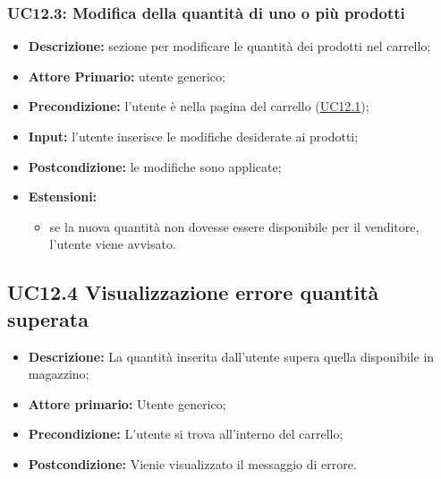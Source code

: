         \subsubsection{UC12.3: Modifica della quantità di uno o più prodotti}
        \begin{itemize}
            \item \textbf{Descrizione:} sezione per modificare le quantità dei prodotti nel carrello;
            \item \textbf{Attore Primario:} utente generico;
            \item \textbf{Precondizione:} l'utente è nella pagina del carrello (\hyperref[sec:UC12.1]{\underline{UC12.1}});
            \item \textbf{Input:} l'utente inserisce le modifiche desiderate ai prodotti;
            \item \textbf{Postcondizione:} le modifiche sono applicate;
            \item \textbf{Estensioni:} 
                \begin{itemize}
                    \item se la nuova quantità non dovesse essere disponibile per il venditore, l'utente viene avvisato.
                \end{itemize}
        \end{itemize}
        \subsection{UC12.4 Visualizzazione errore quantità superata}
        \begin{itemize}
            \item \textbf{Descrizione:} La quantità inserita dall'utente supera quella disponibile in magazzino;
            \item \textbf{Attore primario:} Utente generico;
            \item \textbf{Precondizione:} L'utente si trova all'interno del carrello;
            \item \textbf{Postcondizione:} Vienie visualizzato il messaggio di errore.
        \end{itemize}